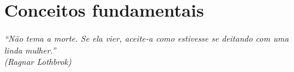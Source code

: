 \chapter{Conceitos fundamentais}\label{CAP_CONCEITOS_FUNDAMENTAIS}
\begin{flushright}
	\textit{``Não tema a morte. Se ela vier, aceite-a como estivesse se deitando com uma linda mulher.''\\
	(Ragnar Lothbrok)}
\end{flushright}

